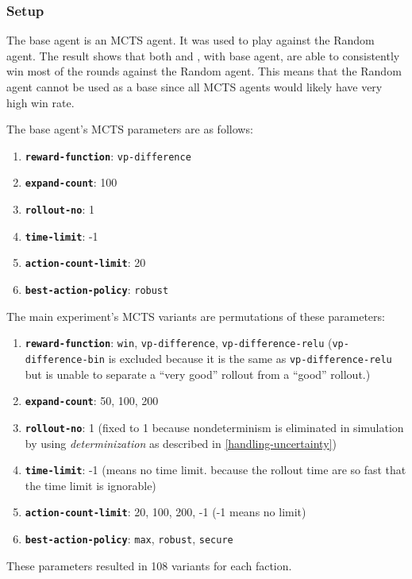 \subsubsection{Setup} \label{main-exp-setup}
The base agent is an MCTS agent. It was used to play against the Random agent. The result shows that both \Marquise{} and \Eyrie{}, with base agent, are able to consistently win most of the rounds against the Random agent. This means that the Random agent cannot be used as a base since all MCTS agents would likely have very high win rate.


The base agent's MCTS parameters are as follows:
\begin{enumerate}
    \item \textbf{\texttt{reward-function}}: \texttt{vp-difference}
    \item \textbf{\texttt{expand-count}}: 100
    \item \textbf{\texttt{rollout-no}}: 1
    \item \textbf{\texttt{time-limit}}: -1
    \item \textbf{\texttt{action-count-limit}}: 20
    \item \textbf{\texttt{best-action-policy}}: \texttt{robust}
\end{enumerate}

The main experiment's MCTS variants are permutations of these parameters:
\begin{enumerate}
    \item \textbf{\texttt{reward-function}}: \texttt{win}, \texttt{vp-difference}, \texttt{vp-difference-relu} (\texttt{vp-difference-bin} is excluded because it is the same as \texttt{vp-difference-relu} but is unable to separate a ``very good'' rollout from a ``good'' rollout.)
    \item \textbf{\texttt{expand-count}}: 50, 100, 200
    \item \textbf{\texttt{rollout-no}}: 1 (fixed to 1 because nondeterminism is eliminated in simulation by using \textit{determinization} as described in \ref{handling-uncertainty})
    \item \textbf{\texttt{time-limit}}: -1 (means no time limit. because the rollout time are so fast that the time limit is ignorable)
    \item \textbf{\texttt{action-count-limit}}: 20, 100, 200, -1 (-1 means no limit)
    \item \textbf{\texttt{best-action-policy}}: \texttt{max}, \texttt{robust}, \texttt{secure}
\end{enumerate}
These parameters resulted in 108 variants for each faction.

